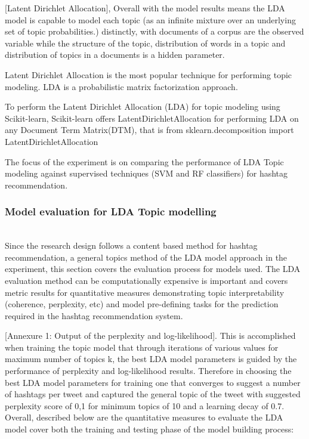 [Latent Dirichlet Allocation], Overall with the model results means the LDA model is capable to model each topic (as an infinite mixture over an underlying set of topic probabilities.) distinctly, with documents of a corpus are the observed variable while the structure of the topic, distribution of words in a topic and distribution of topics in a documents is a hidden parameter.  

Latent Dirichlet Allocation is the most popular technique for performing topic modeling. LDA is a probabilistic matrix factorization approach.

To perform the Latent Dirichlet Allocation (LDA) for topic modeling using Scikit-learn, Scikit-learn offers LatentDirichletAllocation for performing LDA on any Document Term Matrix(DTM), that is from sklearn.decomposition import LatentDirichletAllocation

The focus of the experiment is on comparing the performance of LDA Topic modeling against supervised techniques (SVM and RF classifiers) for hashtag recommendation.

\subsubsection{Model evaluation for LDA Topic modelling }\\

Since the research design follows a content based method for hashtag recommendation, a general topics method of the LDA model approach in the experiment, this section covers the evaluation process for models used.   The LDA evaluation method can be computationally expensive is important and covers metric results for quantitative measures demonstrating topic interpretability (coherence, perplexity, etc) and model pre-defining tasks for the prediction required in the hashtag recommendation system.  

[Annexure 1: Output of the perplexity and log-likelihood].  This is accomplished when training the topic model that through iterations of various values for maximum number of topics k, the best LDA model parameters is guided by the performance of perplexity and log-likelihood results.  Therefore in choosing the best LDA model parameters for training one  that converges to suggest a number of hashtags per tweet and captured the general topic of the tweet with suggested perplexity score of 0,1 for minimum topics of 10 and a learning decay of 0.7.  
Overall, described below are the quantitative measures to evaluate the LDA model cover both the training and testing phase of the model building process:

